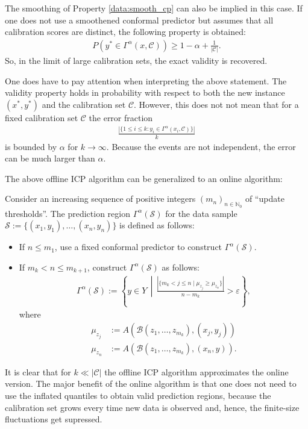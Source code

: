 \begin{property}[Validity]
        The smoothing of Property \ref{data:smooth_cp} can also be implied in this case. If one does not use a smoothened conformal predictor but assumes that all calibration scores are distinct, the following property is obtained:
        \begin{gather}
            P(y^*\in\Gamma^\alpha(x,\mathcal{C}))\geq 1 - \alpha + \frac{1}{|\mathcal{C}|}.
        \end{gather}
        So, in the limit of large calibration sets, the exact validity is recovered.
    \end{property}
    \begin{remark}
        One does have to pay attention when interpreting the above statement. The validity property holds in probability with respect to both the new instance $(x^*,y^*)$ and the calibration set $\mathcal{C}$. However, this does not not mean that for a fixed calibration set $\mathcal{C}$ the error fraction
        \begin{gather}
            \frac{|\{1\leq i\leq k:y_i\in\Gamma^\alpha(x_i,\mathcal{C})\}|}{k}
        \end{gather}
        is bounded by $\alpha$ for $k\longrightarrow\infty$. Because the events are not independent, the error can be much larger than $\alpha$.
    \end{remark}

    The above offline ICP algorithm can be generalized to an online algorithm:
    \begin{construct}
        Consider an increasing sequence of positive integers $(m_n)_{n\in\mathbb{N}_0}$ of ``update thresholds''. The prediction region $\Gamma^\alpha(\mathcal{S})$ for the data sample $\mathcal{S}:=\{(x_1,y_1),\ldots,(x_n,y_n)\}$ is defined as follows:
        \begin{itemize}
            \item If $n\leq m_1$, use a fixed conformal predictor to construct $\Gamma^\alpha(\mathcal{S})$.
            \item If $m_k<n\leq m_{k+1}$, construct $\Gamma^\alpha(\mathcal{S})$ as follows:
            \begin{gather}
                \Gamma^\alpha(\mathcal{S}) := \left\{y\in Y\,\middle\vert\,\frac{|\{m_k<j\leq n\mid\mu_{z_j}\geq\mu_{z_n}\}|}{n-m_k}>\varepsilon\right\},
            \end{gather}
            where
            \begin{align*}
                \mu_{z_j} &:= A(\mathcal{B}(z_1,\ldots,z_{m_k}),(x_j,y_j))\\
                \mu_{z_n} &:= A(\mathcal{B}(z_1,\ldots,z_{m_k}),(x_n,y)).
            \end{align*}
        \end{itemize}
        It is clear that for $k\ll|\mathcal{C}|$ the offline ICP algorithm approximates the online version. The major benefit of the online algorithm is that one does not need to use the inflated quantiles to obtain valid prediction regions, because the calibration set grows every time new data is observed and, hence, the finite-size fluctuations get supressed.
    \end{construct}


